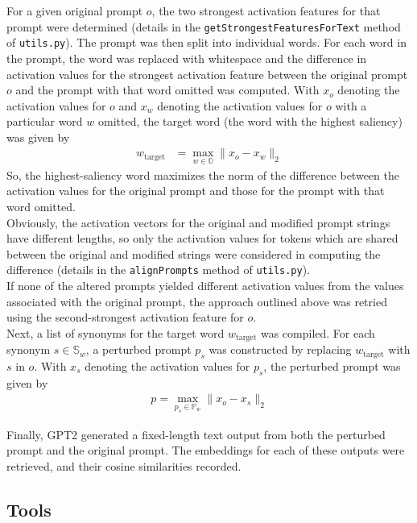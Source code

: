 \documentclass{article}
\begin{document}
For a given original prompt $o$, the two strongest activation features for that prompt were determined (details in the \texttt{getStrongestFeaturesForText} method of \texttt{utils.py}). The prompt was then split into individual words. For each word in the prompt, the word was replaced with whitespace and the difference in activation values for the strongest activation feature between the original prompt $o$ and the prompt with that word omitted was computed. With $x_{o}$ denoting the activation values for $o$ and $x_{w}$ denoting the activation values for $o$ with a particular word $w$ omitted, the target word (the word with the highest saliency) was given by
\begin{align*}
w_\text{target} &= \max_{w \in \mathbb{O}} \lVert x_{o} - x_w \rVert_2 
\end{align*}
So, the highest-saliency word maximizes the norm of the difference between the activation values for the original prompt and those for the prompt with that word omitted. \\ 

Obviously, the activation vectors for the original and modified prompt strings have different lengths, so only the activation values for tokens which are shared between the original and modified strings were considered in computing the difference (details in the \texttt{alignPrompts} method of \texttt{utils.py}).\\ 

If none of the altered prompts yielded different activation values from the values associated with the original prompt, the approach outlined above was retried using the second-strongest activation feature for $o$. \\

Next, a list of synonyms for the target word $w_\text{target}$ was compiled. For each synonym $s \in \mathbb{S}_w$, a perturbed prompt $p_s$ was constructed by replacing $w_\text{target}$ with $s$ in $o$. With $x_s$ denoting the activation values for $p_s$, the perturbed prompt was given by 
\begin{align*}
p = \max_{p_s \in \mathbb{P}_w} \lVert x_o - x_s \rVert_2
\end{align*}

Finally, GPT2 generated a fixed-length text output from both the perturbed prompt and the original prompt. The embeddings for each of these outputs were retrieved, and their cosine similarities recorded.

\subsection*{Tools}
\end{document}
